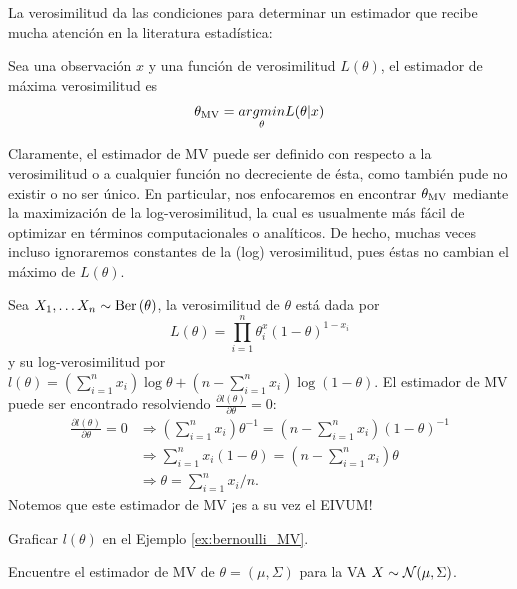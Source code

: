 La verosimilitud da las condiciones para determinar un estimador que recibe mucha atención en la literatura estadística: 

\begin{definition}
	Sea una observación $x$ y una función de verosimilitud $L(\theta)$, el estimador de máxima verosimilitud es 
	\begin{equation}
		{\theta_\text{MV}} = \underset{\theta}{argmin} L(\theta|x)
	\end{equation}	
\end{definition}

Claramente, el estimador de MV puede ser definido con respecto a la verosimilitud o a cualquier función no decreciente de ésta, como también pude no existir o no ser único. En particular, nos enfocaremos en encontrar ${\theta_\text{MV}}$ mediante la maximización de la log-verosimilitud, la cual es usualmente más fácil de optimizar en términos computacionales o analíticos. De hecho, muchas veces incluso ignoraremos constantes de la (log) verosimilitud, pues éstas no cambian el máximo de $L(\theta)$.

\begin{example}
	\label{ex:bernoulli_MV}
	Sea $X_1,\ldots X_n\sim\text{Ber}\left(\theta\right)$, la verosimilitud de $\theta$ está dada por 
	\begin{equation}
		L(\theta) = \prod_{i=1}^n\theta^x_i(1-\theta)^{1-x_i}
	\end{equation}
	y su log-verosimilitud por $l(\theta) = (\sum_{i=1}^nx_i)\log \theta + (n-\sum_{i=1}^nx_i)\log(1-\theta)$. El estimador de  MV puede ser encontrado resolviendo $\frac{\partial l(\theta)}{\partial \theta} = 0$:
	\begin{align*}
	\frac{\partial l(\theta)}{\partial \theta} =0 
	&\Rightarrow  (\sum_{i=1}^nx_i) \theta^{-1} = (n-\sum_{i=1}^nx_i)(1-\theta)^{-1}\\
	&\Rightarrow  \sum_{i=1}^nx_i (1-\theta) = (n-\sum_{i=1}^nx_i) \theta\\
	&\Rightarrow  \theta = \sum_{i=1}^nx_i/n.
	\end{align*}
Notemos que este estimador de MV ¡es a su vez el EIVUM!	
\end{example}


\begin{exercise}
	Graficar $l(\theta)$ en el Ejemplo \ref{ex:bernoulli_MV}.
\end{exercise}

\begin{exercise}
	Encuentre el estimador de MV de $\theta = (\mu,\Sigma)$ para la VA $X\sim{\mathcal N}(\mu,\Sigma)$.
\end{exercise}

